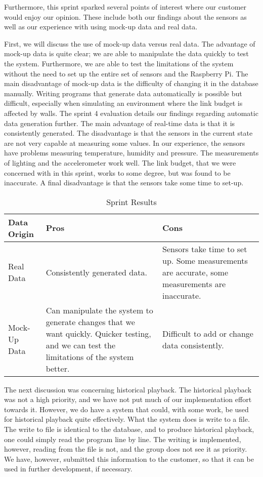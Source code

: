 \documentclass[../document]{subfiles}
\begin{document}
Furthermore, this sprint sparked several points of interest where our customer would enjoy our opinion. These include both our findings about the sensors as well as our experience with using mock-up data and real data.

First, we will discuss the use of mock-up data versus real data. The advantage of mock-up data is quite clear; we are able to manipulate the data quickly to test the system. Furthermore, we are able to test the limitations of the system without the need to set up the entire set of sensors and the \gls{Raspberry Pi}. The main disadvantage of mock-up data is the difficulty of changing it in the database manually. Writing programs that generate data automatically is possible but difficult, especially when simulating an environment where the link budget is affected by walls. The sprint 4 evaluation details our findings regarding automatic data generation further. The main advantage of real-time data is that it is consistently generated. The disadvantage is that the sensors in the current state are not very capable at measuring some values. In our experience, the sensors have problems measuring temperature, humidity and pressure. The measurements of lighting and the accelerometer work well. The link budget, that we were concerned with in this sprint, works to some degree, but was found to be inaccurate. A final disadvantage is that the sensors take some time to set-up.

\begin{table}[H]
\caption{Sprint Results}
\centering
\begin{tabularx}{\textwidth}{|l|X|X|}
\hline
Data Origin
&Pros
&Cons
\\ \hline Real Data
&Consistently generated data.
&Sensors take time to set up. Some measurements are accurate, some measurements are inaccurate.
\\ \hline Mock-Up Data
&Can manipulate the system to generate changes that we want quickly. Quicker testing, and we can test the limitations of the system better.
&Difficult to add or change data consistently.
\\ \hline 
\end{tabularx}
\end{table}	

The next discussion was concerning historical playback. The historical playback was not a high priority, and we have not put much of our implementation effort towards it. However, we do have a system that could, with some work, be used for historical playback quite effectively. What the system does is write to a file. The write to file is identical to the database, and to produce historical playback, one could simply read the program line by line. The writing is implemented, however, reading from the file is not, and the group does not see it as priority. We have, however, submitted this information to the customer, so that it can be used in further development, if necessary.
\end{document}
